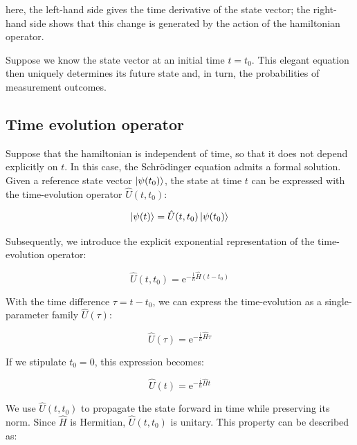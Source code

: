 here, the left-hand side gives the time derivative of the state vector;
the right-hand side shows that this change is generated by the action of the hamiltonian operator.

Suppose we know the state vector at an initial time $t=t_0$. This elegant equation then uniquely determines its future state and, in turn, the probabilities of measurement outcomes.

\subsection{Time evolution operator}

Suppose that the hamiltonian is independent of time, so that it does not depend explicitly on $t$.
In this case, the Schrödinger equation admits a formal solution.
Given a reference state vector $\ket{\psi(t_0)}$,
the state at time $t$ can be expressed with the time-evolution operator $\hat{U}(t,t_0)$:

\begin{equation}
    \ket{\psi(t)}=\hat{U}(t,t_0)\ket{\psi(t_0)}
\label{state_time_evolution}
\end{equation}

Subsequently, we introduce the explicit exponential representation of the time-evolution operator:

\begin{equation}
    \hat{U}(t,t_0)=\mathrm{e}^{-\frac{\mathrm{i}}{\hbar}\hat{H}(t-t_0)}
\label{time_evolution_operator}
\end{equation}

With the time difference $\tau=t-t_0$, we can express the time-evolution as a single-parameter family $\hat{U}(\tau)$:

\begin{equation}
    \hat{U}(\tau)=\mathrm{e}^{-\frac{\mathrm{i}}{\hbar}\hat{H}\tau}
\label{time_evolution_operator_tau}
\end{equation}

If we stipulate $t_0=0$, this expression becomes:

\begin{equation}
    \hat{U}(t)=\mathrm{e}^{-\frac{\mathrm{i}}{\hbar}\hat{H}t}
\label{time_evolution_operator_reduced_form}
\end{equation}

We use $\hat{U}(t,t_0)$ to propagate the state forward in time while preserving its norm.
Since $\hat{H}$ is Hermitian, $\hat{U}(t,t_0)$ is unitary.
This property can be described as:

